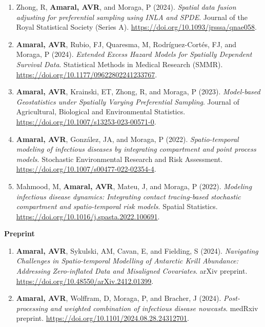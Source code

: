 \documentclass[10pt, ]{article}
\begin{document}
	\begin{enumerate}[label*=\arabic*., noitemsep]
		\item  Zhong, R, \textbf{Amaral, AVR}, and Moraga, P (2024). \textit{ Spatial data fusion adjusting for preferential sampling using INLA and SPDE}. Journal of the Royal Statistical Society (Series A). \url{https://doi.org/10.1093/jrsssa/qnae058}. 
		\item  \textbf{Amaral, AVR}, Rubio, FJ, Quaresma, M, Rodríguez-Cortés, FJ, and Moraga, P (2024). \textit{Extended Excess Hazard Models for Spatially Dependent Survival Data}. Statistical Methods in Medical Research (SMMR). \url{https://doi.org/10.1177/09622802241233767}.
		\item  \textbf{Amaral, AVR}, Krainski, ET, Zhong, R, and Moraga, P (2023). \textit{Model-based Geostatistics under Spatially Varying Preferential Sampling}.  Journal of Agricultural, Biological and Environmental Statistics. \url{https://doi.org/10.1007/s13253-023-00571-0}.
		\item  \textbf{Amaral, AVR}, González, JA, and Moraga, P (2022). \textit{Spatio-temporal modeling of infectious diseases by integrating compartment and point process models}. Stochastic Environmental Research and Risk Assessment. \url{https://doi.org/10.1007/s00477-022-02354-4}.
		\item  Mahmood, M, \textbf{Amaral, AVR}, Mateu, J, and Moraga, P (2022). \textit{Modeling infectious disease dynamics: Integrating contact tracing-based stochastic compartment and spatio-temporal risk models}. Spatial Statistics. \url{https://doi.org/10.1016/j.spasta.2022.100691}.
	\end{enumerate} \vspace{-5pt}

	\noindent\textbf{Preprint} \vspace{-5pt}

	\begin{enumerate}[label*=\arabic*., noitemsep]
		\item \textbf{Amaral, AVR}, Sykulski, AM, Cavan, E, and Fielding, S (2024). \textit{Navigating Challenges in Spatio-temporal Modelling of Antarctic Krill Abundance: Addressing Zero-inflated Data and Misaligned Covariates}. arXiv preprint. \url{https://doi.org/10.48550/arXiv.2412.01399}.			
		\item \textbf{Amaral, AVR}, Wolffram, D, Moraga, P, and Bracher, J (2024). \textit{Post-processing and weighted combination of infectious disease nowcasts}. medRxiv preprint. \url{https://doi.org/10.1101/2024.08.28.24312701}.			
	\end{enumerate}
	\vspace{-2pt}
	
\end{document}
